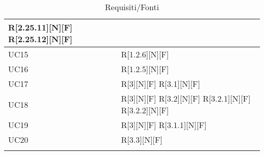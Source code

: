 \begin{longtable}{X | X}
R[2.25.11][N][F] \newline
R[2.25.12][N][F]  \\
\hline
UC15 & R[1.2.6][N][F] \\
\hline
UC16 & R[1.2.5][N][F]  \\
\hline
UC17 & R[3][N][F] \newline
R[3.1][N][F]  \\
\hline
UC18 & R[3][N][F] \newline
R[3.2][N][F] \newline
R[3.2.1][N][F] \newline
R[3.2.2][N][F]  \\
\hline
UC19 & R[3][N][F] \newline
R[3.1.1][N][F]  \\
\hline
UC20 & R[3.3][N][F]  \\
\bottomrule
\caption{Requisiti/Fonti}
\end{longtable}   